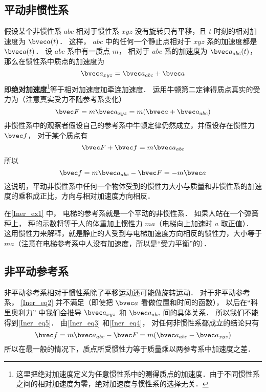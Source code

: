 \subsection{平动非惯性系}
假设某个非惯性系 $abc$ 相对于惯性系 $xyz$ 没有旋转只有平移，且 $t$ 时刻的相对加速度为 $\bvec a(t)$． 这样， $abc$ 中的任何一个静止点相对于 $xyz$ 系的加速度都是 $\bvec a(t)$． 设 $abc$ 系中有一质点 $m$， 相对于 $abc$ 系的加速度为 $\bvec a_{abc} (t)$， 那么在惯性系中质点的加速度为
\begin{equation}\label{Iner_eq2}
\bvec a_{xyz} = \bvec a_{abc} + \bvec a
\end{equation}
即\textbf{绝对加速度}\footnote{这里把绝对加速度定义为任意惯性系中的测得质点的加速度．由于不同惯性系之间的相对加速度为零，绝对加速度与惯性系的选择无关．}等于相对加速度加牵连加速度． 运用牛顿第二定律得质点真实的受力为（注意真实受力不随参考系变化）
\begin{equation}\label{Iner_eq3}
\bvec F = m \bvec a_{xyz} = m(\bvec a + \bvec a_{abc} )
\end{equation}
非惯性系中的观察者假设自己的参考系中牛顿定律仍然成立，并假设存在惯性力 $\bvec f$， 对于某个质点有
\begin{equation}\label{Iner_eq4}
\bvec F + \bvec f = m \bvec a_{abc}
\end{equation}
所以
\begin{equation}\label{Iner_eq5}
\bvec f = m \bvec a_{abc} - \bvec F =  - m\bvec a
\end{equation}
这说明，平动非惯性系中任何一个物体受到的惯性力大小与质量和非惯性系的加速度的乘积成正比，方向与相对加速度方向相反．

在\autoref{Iner_ex1} 中， 电梯的参考系就是一个平动的非惯性系． 如果人站在一个弹簧秤上， 秤的示数将等于人的体重加上惯性力 $ma$（电梯向上加速时 $a$ 取正值）． 这用惯性力来解释，就是静止的人受到与电梯加速度方向相反的惯性力，大小等于 $ma$（注意在电梯参考系中人没有加速度，所以是“受力平衡”的）．

\subsection{非平动参考系}

非平动参考系相对于惯性系除了平移运动还可能做旋转运动． 对于非平动参考系， \autoref{Iner_eq2} 并不满足（即使把 $\bvec a$ 看做位置和时间的函数）， 以后在“科里奥利力” 中我们会推导 $\bvec a_{xyz}$ 和 $\bvec a_{abc}$ 间的具体关系． 所以我们不能得到\autoref{Iner_eq5}． 由\autoref{Iner_eq3} 和\autoref{Iner_eq4}， 对任何非惯性系都成立的结论只有
\begin{equation}
\bvec f = m \bvec a_{abc} - \bvec F =  m( \bvec a_{abc} - \bvec a_{xyz})
\end{equation}
所以在最一般的情况下，质点所受惯性力等于质量乘以两参考系中加速度之差．


